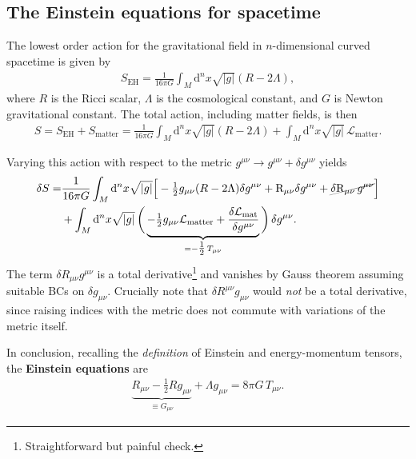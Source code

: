 \documentclass[../geometry_main.tex]{subfiles}
\begin{document}
\subsection{The Einstein equations for spacetime}


\begin{mytheorem}
The lowest order action for the gravitational field in $n$-dimensional curved spacetime is given by
\begin{align}\label{eq:einstein_hilbert_action}
    S_{\mathrm{EH}} = \frac{1}{16\pi G} \int_M \mathrm{d}^n x \sqrt{|g|} (R - 2\Lambda),
\end{align}
where $R$ is the Ricci scalar, $\Lambda$ is the cosmological constant, and $G$ is Newton gravitational constant.
The total action, including matter fields, is then
\begin{align}
    S = S_{\mathrm{EH}} + S_{\mathrm{matter}} = \frac{1}{16\pi G} \int_M \mathrm{d}^n x \sqrt{|g|} (R - 2\Lambda) + \int_M \mathrm{d}^n x \sqrt{|g|} \, \mathcal{L}_{\mathrm{matter}}.
\end{align}

Varying this action with respect to the metric $g^{\mu\nu} \to g^{\mu\nu} + \delta g^{\mu\nu}$ yields 
\begin{align}
    \delta S =& \frac{1}{16\pi G} \int_M \mathrm{d}^n x \sqrt{|g|} \Big[-\tfrac{1}{2}g_{\mu\nu}(R-2\Lambda) \delta g^{\mu\nu}+ \mathrm{R}_{\mu\nu} \delta g^{\mu\nu} +  \graycancel{\delta\mathrm{R}_{\mu\nu}\, g^{\mu\nu}}\Big] 
    \\
    &+ \int_M \mathrm{d}^n x \sqrt{|g|}\,\bigg(\underbrace{-\tfrac{1}{2} g_{\mu\nu}\mathcal{L}_{\mathrm{matter}}+ \frac{\delta \mathcal{L}_{\mathrm{mat}}}{\delta g^{\mu\nu}}}_{= -\tfrac{1}{2}\, T_{\mu\nu}}\bigg)\, \delta g^{\mu\nu}.
\end{align}
The term $\delta R_{\mu\nu} g^{\mu\nu}$ is a total derivative\footnote{Straightforward but painful check.} and vanishes by Gauss theorem assuming suitable BCs on $\delta g_{\mu\nu}$.
Crucially note that $\delta R^{\mu\nu} g_{\mu\nu}$ would \emph{not} be a total derivative, since raising indices with the metric does not commute with variations of the metric itself.

In conclusion, recalling the \emph{definition} of Einstein and energy-momentum tensors, the \textbf{Einstein equations} are
\begin{align}
    \underbrace{R_{\mu\nu} - \tfrac{1}{2} R g_{\mu\nu}}_{\equiv G_{\mu\nu}} + \Lambda g_{\mu\nu} = 8\pi G\, T_{\mu\nu}.
\end{align}
%
\end{mytheorem}
\end{document}
